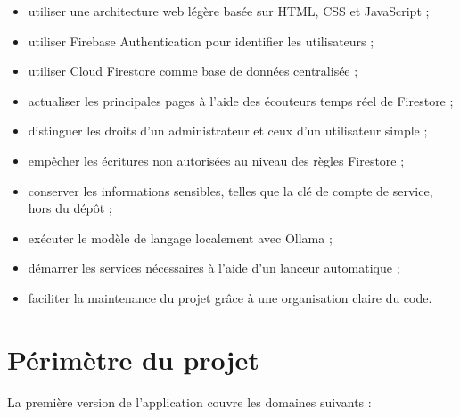 \documentclass{rapportENSIAS}
\begin{document}
\begin{itemize}
\item utiliser une architecture web légère basée sur HTML, CSS et JavaScript ;
\item utiliser Firebase Authentication pour identifier les utilisateurs ;
\item utiliser Cloud Firestore comme base de données centralisée ;
\item actualiser les principales pages à l’aide des écouteurs temps réel de Firestore ;
\item distinguer les droits d’un administrateur et ceux d’un utilisateur simple ;
\item empêcher les écritures non autorisées au niveau des règles Firestore ;
\item conserver les informations sensibles, telles que la clé de compte de service, hors du dépôt ;
\item exécuter le modèle de langage localement avec Ollama ;
\item démarrer les services nécessaires à l’aide d’un lanceur automatique ;
\item faciliter la maintenance du projet grâce à une organisation claire du code.
\end{itemize}

\section{Périmètre du projet}

La première version de l’application couvre les domaines suivants :
\end{document}
